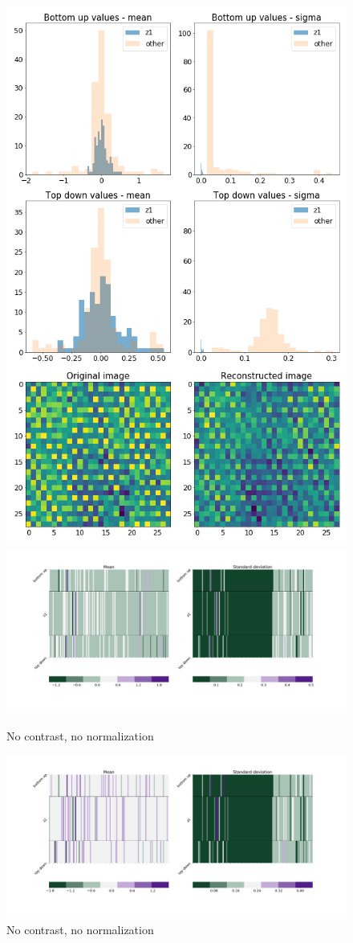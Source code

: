 \documentclass[12pt, english]{article}
\begin{document}
\begin{figure}[H]
\begin{minipage}{0.5\linewidth}
    \includegraphics[width=.6\linewidth]{z1_vis/14_DenseLinLinLadderVAE_noContrastNorm_-stats-2_TD_BU_COMPS_1.png} 
  \end{minipage}

  \begin{minipage}{0.5\linewidth}
    \centering
    \includegraphics[width=.75\linewidth]{z1_vis/14_DenseLinLinLadderVAE_noContrastNorm_-stats-1_vector_comparisons_1.png} 
    \caption{No contrast, no normalization}
    \label{fig:sample-no-norm-no-contrast-1}
  \end{minipage}
  \begin{minipage}{0.5\linewidth}
    \centering
    \includegraphics[width=.75\linewidth]{z1_vis/14_DenseLinLinLadderVAE_noContrastNorm_-stats-2_vector_comparisons_1.png}
    \caption{No contrast, no normalization}
    \label{fig:sample-no-norm-no-contrast-2}
  \end{minipage}
\end{figure}
\end{document}
